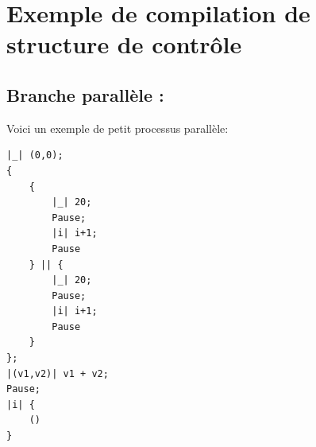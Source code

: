 \documentclass[a4paper]{article}
\renewcommand{\(}{\left(}
\renewcommand{\)}{\right)}
\begin{document}
\section{Exemple de compilation de structure de contrôle}

\subsection{Branche parallèle :}

Voici un exemple de petit processus parallèle:
\begin{verbatim}
|_| (0,0);
{
    {
        |_| 20;
        Pause;
        |i| i+1;
        Pause
    } || {
        |_| 20;
        Pause;
        |i| i+1;
        Pause
    }
};
|(v1,v2)| v1 + v2;
Pause;
|i| {
    ()
}
\end{verbatim}
\end{document}

